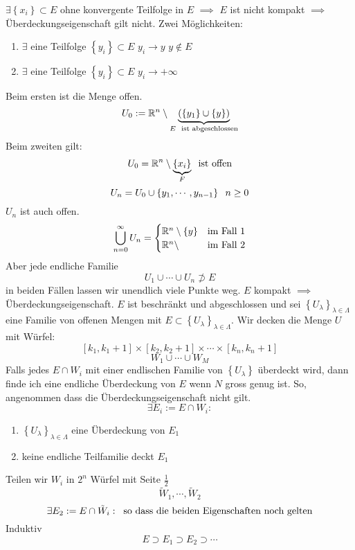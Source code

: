 \begin{Bew}
  $\exists \left\{ x_i \right\}\subset E$ ohne konvergente Teilfolge in $E$ $\implies$ $E$ ist nicht kompakt $\implies$ Überdeckungseigenschaft gilt nicht. Zwei Möglichkeiten:
  \begin{enumerate}
    \item $\exists$ eine Teilfolge $\left\{ y_i \right\}\subset E$ $y_i\to y$ $y\not\in E$
    \item $\exists$ eine Teilfolge $\left\{ y_i \right\}\subset E$ $y_i\to +\infty$
  \end{enumerate}
  Beim ersten ist die Menge offen. 
  \[U_0:=\mathbb{R}^n\setminus \underbrace{\left( \left\{ y_1 \right\}\cup\left\{ y \right\} \right)}_{E\hspace{2mm}\text{ist abgeschlossen}}\]
  Beim zweiten gilt:
  \[U_0=\mathbb{R}^n\setminus\underbrace{\left\{ x_i \right\}}_{F}\hspace{2mm}\text{ist offen}\]
  \[U_n=U_0\cup \left\{ y_1,\cdots,y_{n-1} \right\} \hspace{2mm} n\geq 0\]
  $U_n$ ist auch offen.
  \[\bigcup_{n=0}^{\infty}U_n= \begin{cases}
    \mathbb{R}^n\setminus \left\{ y \right\}& \text{im Fall 1}\\
    \mathbb{R}^n\setminus & \text{im Fall 2}
  \end{cases}\]
  Aber jede endliche Familie
  \[U_1\cup \cdots\cup U_n\not\supset E\]
  in beiden Fällen lassen wir unendlich viele Punkte weg. $E$ kompakt $\implies$ Überdeckungseigenschaft. $E$ ist beschränkt und abgeschlossen und sei $\left\{ U_\lambda \right\}_{\lambda\in\Lambda}$ eine Familie von offenen Mengen mit $E\subset\left\{ U_\lambda \right\}_{\lambda\in\Lambda}$. Wir decken die Menge $U$ mit Würfel:
  \[\left[k_1,k_1+1\right]\times \left[ k_2,k_2+1 \right]\times \cdots\times \left[ k_n,k_n+1 \right]\]
  \[W_1\cup\cdots\cup W_M\]
  Falls jedes $E\cap W_i$ mit einer endlischen Familie von $\left\{ U_\lambda \right\}$ überdeckt wird, dann finde ich eine endliche Überdeckung von $E$ wenn $N$ gross genug ist. So, angenommen dass die Überdeckungseigenschaft nicht gilt.
  \[\exists E_i:= E\cap W_i:\]
  \begin{enumerate}
    \item $\left\{ U_\lambda \right\}_{\lambda\in\Lambda}$ eine Überdeckung von $E_1$
    \item keine endliche Teilfamilie deckt $E_1$
  \end{enumerate}
  Teilen wir $W_i$ in $2^n$ Würfel mit Seite $\frac{1}{2}$
  \[\tilde W_1,\cdots,\tilde W_2\]
  \[\exists E_2:= E\cap \tilde W_i:\hspace{2mm}\text{so dass die beiden Eigenschaften noch gelten}\]
  Induktiv
  \[E\supset E_1\supset E_2\supset\cdots\]

\end{Bew}
